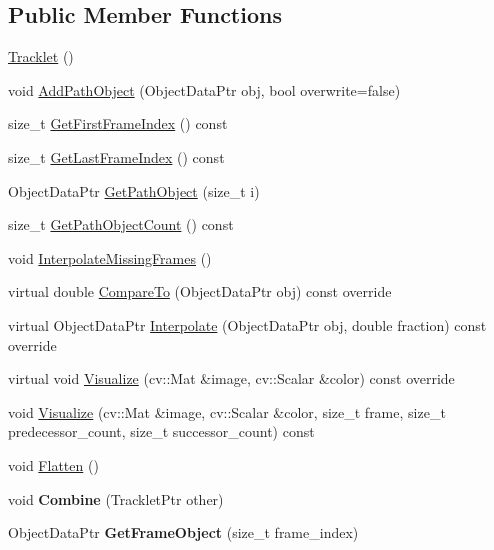 \subsection*{Public Member Functions}
\begin{DoxyCompactItemize}
\item 
\hyperlink{classcore_1_1Tracklet_aedf59b5a9a068a28bb7570f2a031d4e7}{Tracklet} ()
\item 
void \hyperlink{classcore_1_1Tracklet_ab0b397f2d0685a927de886dbd36c3bc8}{Add\+Path\+Object} (Object\+Data\+Ptr obj, bool overwrite=false)
\item 
size\+\_\+t \hyperlink{classcore_1_1Tracklet_ae2c79325e151e8401a7a925984bbbe69}{Get\+First\+Frame\+Index} () const 
\item 
size\+\_\+t \hyperlink{classcore_1_1Tracklet_a71487b13697f71abb75949e6fcad9081}{Get\+Last\+Frame\+Index} () const 
\item 
Object\+Data\+Ptr \hyperlink{classcore_1_1Tracklet_a9758349e8f25c479ffc4b21a90149a81}{Get\+Path\+Object} (size\+\_\+t i)
\item 
size\+\_\+t \hyperlink{classcore_1_1Tracklet_a0d27b17706f6c72c093c76e1f65b960f}{Get\+Path\+Object\+Count} () const 
\item 
void \hyperlink{classcore_1_1Tracklet_a10b56b608b24ef547550540e5a755bce}{Interpolate\+Missing\+Frames} ()
\item 
virtual double \hyperlink{classcore_1_1Tracklet_a0357f2fa173941800571432dcbc96dc2}{Compare\+To} (Object\+Data\+Ptr obj) const override
\item 
virtual Object\+Data\+Ptr \hyperlink{classcore_1_1Tracklet_a5fb5e6ab9df668c3477e8b52f115b188}{Interpolate} (Object\+Data\+Ptr obj, double fraction) const override
\item 
virtual void \hyperlink{classcore_1_1Tracklet_a85f92a4059bf89f24a83f28935675181}{Visualize} (cv\+::\+Mat \&image, cv\+::\+Scalar \&color) const override
\item 
void \hyperlink{classcore_1_1Tracklet_aee78c9ec0ee80b1b381083c20e1d3f18}{Visualize} (cv\+::\+Mat \&image, cv\+::\+Scalar \&color, size\+\_\+t frame, size\+\_\+t predecessor\+\_\+count, size\+\_\+t successor\+\_\+count) const 
\item 
void \hyperlink{classcore_1_1Tracklet_a2bdb2f2c8249145808e7029dde6e7df0}{Flatten} ()
\item 
void {\bfseries Combine} (Tracklet\+Ptr other)\hypertarget{classcore_1_1Tracklet_a5bbbf1e2858edaad93c04cc663afeeff}{}\label{classcore_1_1Tracklet_a5bbbf1e2858edaad93c04cc663afeeff}

\item 
Object\+Data\+Ptr {\bfseries Get\+Frame\+Object} (size\+\_\+t frame\+\_\+index)\hypertarget{classcore_1_1Tracklet_a5a0e56045f8c1868b46db87700658260}{}\label{classcore_1_1Tracklet_a5a0e56045f8c1868b46db87700658260}

\end{DoxyCompactItemize}


